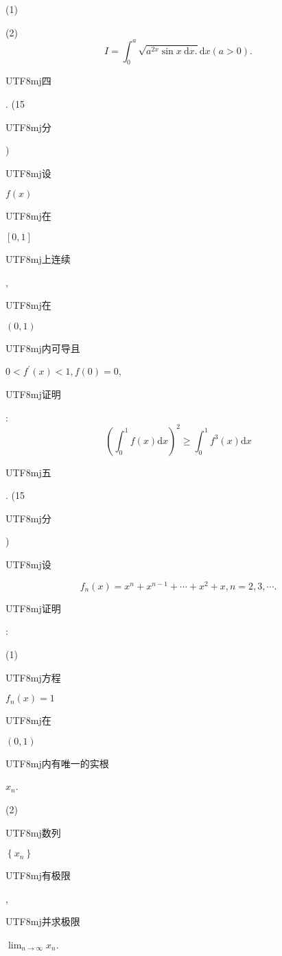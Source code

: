 \documentclass[10pt]{article}
\begin{document}
(1)

(2)
$$
I=\int_{0}^{a} \sqrt{a^{2 x} \sin x \mathrm{~d} x .} \mathrm{d} x(a>0) .
$$
\begin{CJK}{UTF8}{mj}四\end{CJK}. (15 \begin{CJK}{UTF8}{mj}分\end{CJK}) \begin{CJK}{UTF8}{mj}设\end{CJK} $f(x)$ \begin{CJK}{UTF8}{mj}在\end{CJK} $[0,1]$ \begin{CJK}{UTF8}{mj}上连续\end{CJK}, \begin{CJK}{UTF8}{mj}在\end{CJK} $(0,1)$ \begin{CJK}{UTF8}{mj}内可导且\end{CJK} $0<f^{\prime}(x)<1, f(0)=0$, \begin{CJK}{UTF8}{mj}证明\end{CJK}:
$$
\left(\int_{0}^{1} f(x) \mathrm{d} x\right)^{2} \geqslant \int_{0}^{1} f^{3}(x) \mathrm{d} x
$$
\begin{CJK}{UTF8}{mj}五\end{CJK}. (15 \begin{CJK}{UTF8}{mj}分\end{CJK}) \begin{CJK}{UTF8}{mj}设\end{CJK}
$$
f_{n}(x)=x^{n}+x^{n-1}+\cdots+x^{2}+x, n=2,3, \cdots .
$$
\begin{CJK}{UTF8}{mj}证明\end{CJK}:

(1) \begin{CJK}{UTF8}{mj}方程\end{CJK} $f_{n}(x)=1$ \begin{CJK}{UTF8}{mj}在\end{CJK} $(0,1)$ \begin{CJK}{UTF8}{mj}内有唯一的实根\end{CJK} $x_{n}$.

(2) \begin{CJK}{UTF8}{mj}数列\end{CJK} $\left\{x_{n}\right\}$ \begin{CJK}{UTF8}{mj}有极限\end{CJK}, \begin{CJK}{UTF8}{mj}并求极限\end{CJK} $\lim _{n \rightarrow \infty} x_{n}$.
\end{document}
